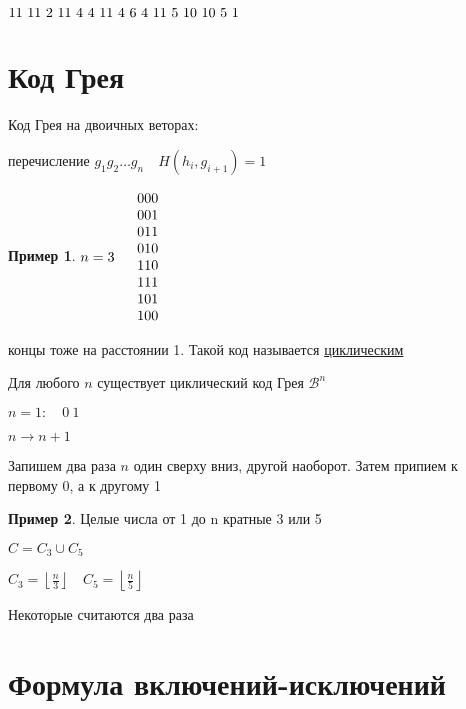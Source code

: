 \documentclass{book}
\theoremstyle{definition}
\newtheorem*{example}{Пример}
\begin{document}
$1\\1~1\\1~2~1 \\1~4~4~1 \\1~4~6~4~1\\1~5~10~10~5~1$

\section{Код Грея}

\begin{definition}
    Код Грея на двоичных веторах:

    перечисление $g_1g_2\ldots g_n\quad H(h_i, g_{i+1})=1$
\end{definition}
\begin{example}
    $n=3\quad
    \begin{tabular}{c}
        000\\001\\011\\010\\110\\111\\101\\100\\
    \end{tabular}$

    концы тоже на расстоянии 1. Такой код называется \underline{циклическим}
\end{example}

\begin{theorem}
    Для любого $n$ существует циклический код Грея  $\mathscr{B}^n$

    $n=1:\quad 0~1$

     $n\to n+1$

     Запишем два раза $n$ один сверху вниз, другой наоборот. Затем припием к первому 0, а к другому 1
\end{theorem}

 \begin{example}
    Целые числа от 1 до n кратные 3 или 5

    $C = C_3\cup C_5$

    $C_3 = \left\lfloor \frac{n}{3} \right\rfloor\quad C_5 = \left\lfloor \frac{n}{5} \right\rfloor$ 

    Некоторые считаются два раза
\end{example}

\section{Формула включений-исключений}
\end{document}
